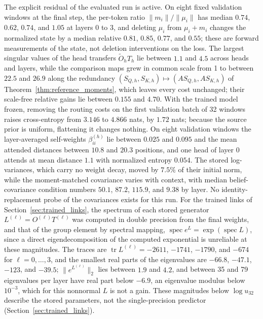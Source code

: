\documentclass[twoside,11pt]{article}
\begin{document}
The explicit residual of the evaluated run is active. On eight fixed validation windows at the final step, the per-token ratio $\|m_i\|/\|\mu_i\|$ has median $0.74$, $0.62$, $0.74$, and $1.05$ at layers 0 to 3, and deleting $\mu_i$ from $\mu_i+m_i$ changes the normalized state by a median relative $0.81$, $0.85$, $0.77$, and $0.55$; %
these are forward measurements of the state, not deletion interventions on the loss. The largest singular values of the head transfers $\widetilde O_hT_h$ lie between $1.1$ and $4.5$ across heads and layers, while the comparison maps grew in common scale from 1 to between $22.5$ and $26.9$ along the redundancy $(S_{Q,h},S_{K,h})\mapsto(AS_{Q,h},AS_{K,h})$ of Theorem~\ref{thm:reference_moments}, which leaves every cost unchanged; their scale-free relative gains lie between $0.155$ and $4.70$. %
With the trained model frozen, removing the routing costs on the first validation batch of 32 windows raises cross-entropy from $3.146$ to $4.866$ nats, by $1.72$ nats; %
because the source prior is uniform, flattening it changes nothing. On eight validation windows the layer-averaged self-weights $\beta_{ii}^{(h)}$ lie between $0.025$ and $0.095$ and the mean attended distances between $10.8$ and $20.3$ positions, and one head of layer 0 attends at mean distance $1.1$ with normalized entropy $0.054$. %
The stored log-variances, which carry no weight decay, moved by $7.5\%$ of their initial norm, while the moment-matched covariance varies with context, with median belief-covariance condition numbers $50.1$, $87.2$, $115.9$, and $9.38$ by layer. %
No identity-replacement probe of the covariances exists for this run.
For the trained links of Section~\ref{sec:trained_links}, the spectrum of each stored generator $L^{(\ell)}=O^{(\ell)}T^{(\ell)}$ was computed in double precision from the final weights, and that of the group element by spectral mapping, $\operatorname{spec}e^{L}=\exp(\operatorname{spec}L)$, since a direct eigendecomposition of the computed exponential is unreliable at these magnitudes. The traces are $\operatorname{tr}L^{(\ell)}=-2611$, $-1741$, $-1790$, and $-674$ for $\ell=0,\ldots,3$, and the smallest real parts of the eigenvalues are $-66.8$, $-47.1$, $-123$, and $-39.5$; $\|e^{L^{(\ell)}}\|_2$ lies between $1.9$ and $4.2$, and between 35 and 79 eigenvalues per layer have real part below $-6.9$, an eigenvalue modulus below $10^{-3}$, which for this nonnormal $L$ is not a gain. These magnitudes below $\log u_{32}$ describe the stored parameters, not the single-precision predictor (Section~\ref{sec:trained_links}). %
\end{document}
